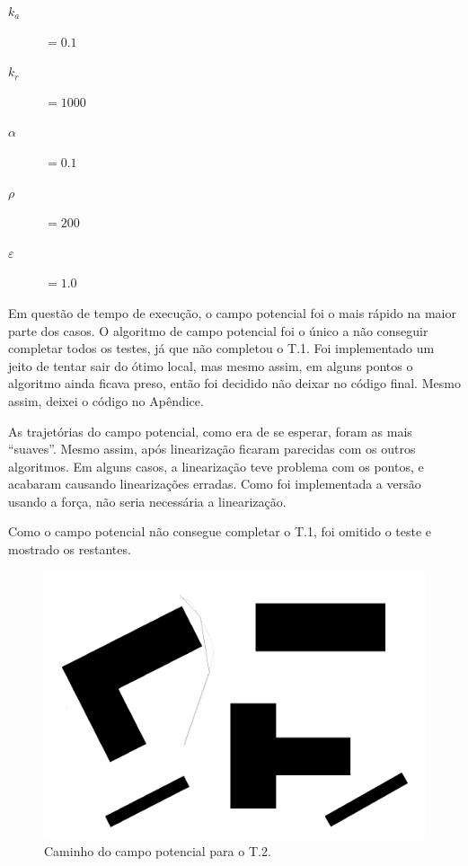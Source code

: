 \documentclass[12pt]{article}
\theoremstyle{plain}
\numberwithin{equation}{section}
\newcommand{\eps}{\varepsilon}
\begin{document}
\begin{description}
  \item[$k_a$]$=0.1$
  \item[$k_r$]$=1000$
  \item[$\alpha$]$=0.1$
  \item[$\rho$]$=200$
  \item[$\eps$]$=1.0$
\end{description}

Em questão de tempo de execução, o campo potencial foi o mais rápido na maior parte dos casos. O
algoritmo de campo potencial foi o único a não conseguir completar todos os testes, já que não
completou o T.1. Foi implementado um jeito de tentar sair do ótimo local, mas mesmo assim, em
alguns pontos o algoritmo ainda ficava preso, então foi decidido não deixar no código final. Mesmo
assim, deixei o código no Apêndice.

As trajetórias do campo potencial, como era de se esperar, foram as mais ``suaves''. Mesmo assim,
após linearização ficaram parecidas com os outros algoritmos. Em alguns casos, a linearização teve
problema com os pontos, e acabaram causando linearizações erradas. Como foi implementada a versão
usando a força, não seria necessária a linearização.

Como o campo potencial não consegue completar o T.1, foi omitido o teste e mostrado os restantes.

\begin{figure}[H]
  \centering\includegraphics[scale=0.4]{imgs/potential_field_1.png}
  \caption{Caminho do campo potencial para o T.2.}
\end{figure}
\end{document}
